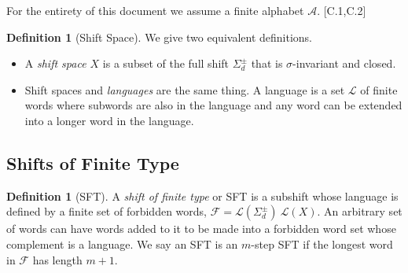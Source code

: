 \documentclass[11pt, reqno]{amsart}
\theoremstyle{plain}
\numberwithin{thm}{subsection}
\theoremstyle{definition}
\newtheorem{defn}[thm]{Definition}
\def\cA{\mathcal{A}}\def\cB{\mathcal{B}}\def\cC{\mathcal{C}}\def\cD{\mathcal{D}}\def\cE{\mathcal{E}}\def\cF{\mathcal{F}}\def\cG{\mathcal{G}}\def\cH{\mathcal{H}}\def\cI{\mathcal{I}}\def\cJ{\mathcal{J}}\def\cK{\mathcal{K}}\def\cL{\mathcal{L}}\def\cM{\mathcal{M}}\def\cN{\mathcal{N}}\def\cO{\mathcal{O}}\def\cP{\mathcal{P}}\def\cQ{\mathcal{Q}}\def\cR{\mathcal{R}}\def\cS{\mathcal{S}}\def\cT{\mathcal{T}}\def\cU{\mathcal{U}}\def\cV{\mathcal{V}}\def\cW{\mathcal{W}}\def\cX{\mathcal{X}}\def\cY{\mathcal{Y}}\def\cZ{\mathcal{Z}}
\begin{document}





For the entirety of this document we assume a finite alphabet $\cA$. \cite{lind-marc}[C.1,C.2]

\begin{defn}[Shift Space] \cite[L.2]{wolf} We give two equivalent definitions.
  \begin{itemize}
    \item A \textit{shift space $X$} is a subset of the full shift $\Sigma_d^{\pm}$ that is $\sigma$-invariant and closed.
    \item Shift spaces and \textit{languages} are the same thing. A language is a set $\cL$ of finite words where subwords are also in the language and any word can be extended into a longer word in the language. 
  \end{itemize}
\end{defn}

\subsection{Shifts of Finite Type}
\begin{defn}[SFT]\cite[L.2]{wolf}
  A \textit{shift of finite type} or SFT is a subshift whose language is defined by a finite set of forbidden words, $\cF = \cL(\Sigma_d^{\pm}) \ \cL(X)$. An arbitrary set of words can have words added to it to be made into a forbidden word set whose complement is a language. We say an SFT is an $m$-step SFT if the longest word in $\cF$ has length $m+1$.
\end{defn}
\end{document}
